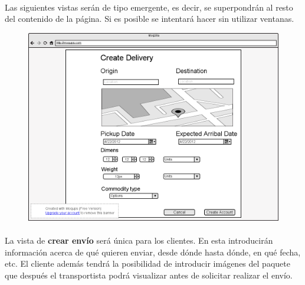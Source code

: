 \documentclass[10pt, a4paper,spanish]{article}
\begin{document}
			\paragraph{}
			Las siguientes vistas serán de tipo emergente, es decir, se superpondrán al resto del contenido de la página. Si es posible se intentará hacer sin utilizar ventanas.


			\begin{figure}[H]
				\centering
				\begin{minipage}[b]{0.7\textwidth}
					\includegraphics[width=\textwidth]{res/CrearEnvio.png}

				\end{minipage}
			\end{figure}

			\paragraph{}
			La vista de \textbf{crear envío} será única para los clientes. En esta introducirán información acerca de qué quieren enviar, desde dónde hasta dónde, en qué fecha, etc. El cliente además tendrá la posibilidad de introducir imágenes del paquete que después el transportista podrá visualizar antes de solicitar realizar el envío.
\end{document}
